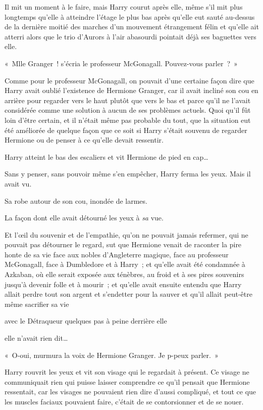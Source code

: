 Il mit un moment à le faire, mais Harry courut après elle, même s'il mit plus longtemps qu'elle à atteindre l'étage le plus bas après qu'elle eut sauté au-dessus de la dernière moitié des marches d'un mouvement étrangement félin et qu'elle ait atterri alors que le trio d'Aurors à l'air abasourdi pointait déjà ses baguettes vers elle.

«~Mlle Granger~! s'écria le professeur McGonagall. Pouvez-vous parler~?~»

Comme pour le professeur McGonagall, on pouvait d'une certaine façon dire que Harry avait oublié l'existence de Hermione Granger, car il avait incliné son cou en arrière pour regarder vers le haut plutôt que vers le bas et parce qu'il ne l'avait considérée comme une solution à aucun de ses problèmes actuels. Quoi qu'il fût loin d'être certain, et il n'était même pas probable du tout, que la situation eut été améliorée de quelque façon que ce soit si Harry s'était souvenu de regarder Hermione ou de penser à ce qu'elle devait ressentir.

Harry atteint le bas des escaliers et vit Hermione de pied en cap…

Sans y penser, sans pouvoir même s'en empêcher, Harry ferma les yeux. Mais il avait vu.

Sa robe autour de son cou, inondée de larmes.

La façon dont elle avait détourné les yeux à \emph{sa} vue.

Et l'œil du souvenir et de l'empathie, qu'on ne pouvait jamais refermer, qui ne pouvait pas détourner le regard, sut que Hermione venait de raconter la pire honte de sa vie face aux nobles d'Angleterre magique, face au professeur McGonagall, face à Dumbledore et à Harry~; et qu'elle avait été condamnée à Azkaban, où elle serait exposée aux ténèbres, au froid et à ses pires souvenirs jusqu'à devenir folle et à mourir~; et qu'elle avait ensuite entendu que Harry allait perdre tout son argent et s'endetter pour la sauver et qu'il allait peut-être même sacrifier sa vie

avec le Détraqueur quelques pas à peine derrière elle

elle n'avait rien dit…

«~O-oui, murmura la voix de Hermione Granger. Je p-peux parler.~»

Harry rouvrit les yeux et vit son visage qui le regardait à présent. Ce visage ne communiquait rien qui puisse laisser comprendre ce qu'il pensait que Hermione ressentait, car les visages ne pouvaient rien dire d'aussi compliqué, et tout ce que les muscles faciaux pouvaient faire, c'était de se contorsionner et de se nouer.

